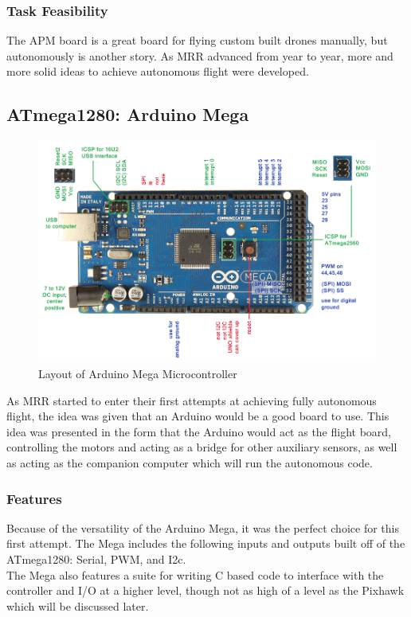\documentclass[conference,12pt, ]{IEEEtran}
\begin{document}
\subsubsection{Task Feasibility}
The APM board is a great board for flying custom built drones manually, but autonomously is another story. As MRR advanced from year to year, more and more solid ideas to achieve autonomous flight were developed.

\subsection{ATmega1280: Arduino Mega }
\begin{figure}
	\includegraphics[scale=0.25]{mega.png}
	\caption {Layout of Arduino Mega  Microcontroller}
\end{figure}
As MRR started to enter their first attempts at achieving fully autonomous flight, the idea was given that an Arduino would be a good board to use. This idea was presented in the form that the Arduino would act as the flight board, controlling the motors and acting as a bridge for other auxiliary sensors, as well as acting as the companion computer which will run the autonomous code. 

\subsubsection{Features}
Because of the versatility of the Arduino Mega, it was the perfect choice for this first attempt. The Mega includes the following inputs and outputs built off of the ATmega1280:  Serial, PWM, and I2c.\cite{arduino} \\
The Mega also features a suite for writing C based code to interface with the controller and I/O at a higher level, though not as high of a level as the Pixhawk which will be discussed later. 
\end{document}
